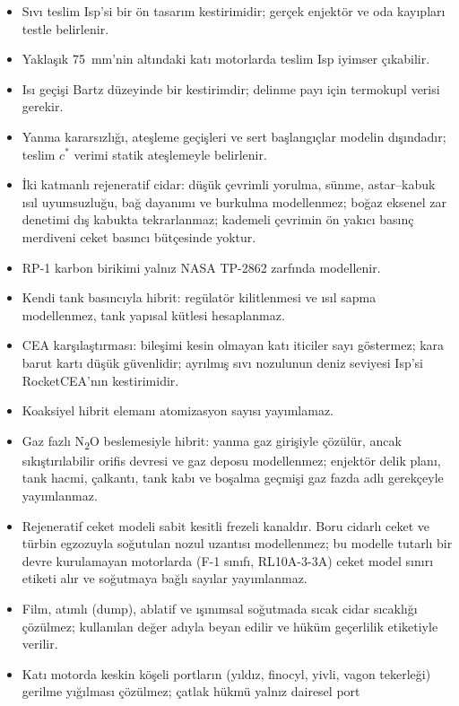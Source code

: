 \documentclass[11pt,a4paper]{article}
\newcommand{\ui}[1]{\textsf{#1}}
\begin{document}
\begin{itemize}[leftmargin=1.4em]
  \item Sıvı teslim Isp'si bir ön tasarım kestirimidir; gerçek enjektör ve
  oda kayıpları testle belirlenir.
  \item Yaklaşık 75~mm'nin altındaki katı motorlarda teslim Isp iyimser
  çıkabilir.
  \item Isı geçişi Bartz düzeyinde bir kestirimdir; delinme payı için
  termokupl verisi gerekir.
  \item Yanma kararsızlığı, ateşleme geçişleri ve sert başlangıçlar modelin
  dışındadır; teslim $c^*$ verimi statik ateşlemeyle belirlenir.
  \item İki katmanlı rejeneratif cidar: düşük çevrimli yorulma, sünme,
  astar--kabuk ısıl uyumsuzluğu, bağ dayanımı ve burkulma modellenmez; boğaz
  eksenel zar denetimi dış kabukta tekrarlanmaz; kademeli çevrimin ön yakıcı
  basınç merdiveni ceket basıncı bütçesinde yoktur.
  \item RP-1 karbon birikimi yalnız NASA TP-2862 zarfında modellenir.
  \item Kendi tank basıncıyla hibrit: regülatör kilitlenmesi ve ısıl sapma
  modellenmez, tank yapısal kütlesi hesaplanmaz.
  \item CEA karşılaştırması: bileşimi kesin olmayan katı iticiler sayı
  göstermez; kara barut kartı düşük güvenlidir; ayrılmış sıvı nozulunun deniz
  seviyesi Isp'si RocketCEA'nın kestirimidir.
  \item Koaksiyel hibrit elemanı atomizasyon sayısı yayımlamaz.
  \item Gaz fazlı N\textsubscript{2}O beslemesiyle hibrit: yanma gaz girişiyle
  çözülür, ancak sıkıştırılabilir orifis devresi ve gaz deposu modellenmez;
  enjektör delik planı, tank hacmi, çalkantı, tank kabı ve boşalma geçmişi
  gaz fazda adlı gerekçeyle yayımlanmaz.
  \item Rejeneratif ceket modeli sabit kesitli frezeli kanaldır. Boru cidarlı
  ceket ve türbin egzozuyla soğutulan nozul uzantısı modellenmez; bu modelle
  tutarlı bir devre kurulamayan motorlarda (F-1 sınıfı, RL10A-3-3A) ceket
  \ui{model sınırı} etiketi alır ve soğutmaya bağlı sayılar yayımlanmaz.
  \item Film, atımlı (dump), ablatif ve ışınımsal soğutmada sıcak cidar
  sıcaklığı çözülmez; kullanılan değer adıyla beyan edilir ve hüküm geçerlilik
  etiketiyle verilir.
  \item Katı motorda keskin köşeli portların (yıldız, finocyl, yivli, vagon
  tekerleği) gerilme yığılması çözülmez; çatlak hükmü yalnız dairesel port

\end{itemize}
\end{document}
